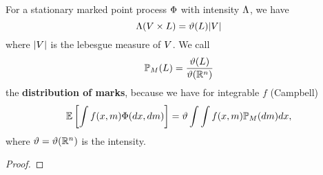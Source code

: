 \begin{lemma}[Campbell]\label{lem: Campbell}
	For a stationary marked point process \(\Phi\) with intensity
	\(\Lambda\), we have	
	\[
		\Lambda(V \times L) = \vartheta(L) |V|
	\]
	where \(|V|\) is the lebesgue measure of \(V\). We call
	\[
		\mathbb{P}_M(L) = \frac{\vartheta(L)}{\vartheta(\mathbb{R}^n)}
	\]
	the \textbf{distribution of marks}, because we have for integrable \(f\)
	(Campbell)
	\[
		\mathbb{E}\left[\int f(x,m) \Phi(dx,dm)\right]
		= \vartheta \int \int f(x,m) \mathbb{P}_M(dm) dx,
	\]
	where \(\vartheta=\vartheta(\mathbb{R}^n)\) is the intensity.
\end{lemma}

\begin{proof}
\end{proof}
